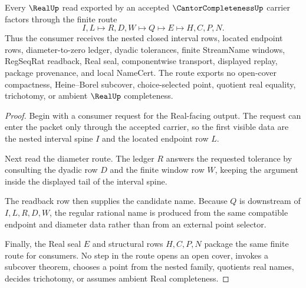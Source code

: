 \begin{theorem}
\label{thm:cantor-completeness-nested-diameter-handoff}
Every $\RealUp$ read exported by an accepted $\CantorCompletenessUp$ carrier factors through the finite route
$$
I,L \longmapsto R,D,W \longmapsto Q \longmapsto E \longmapsto H,C,P,N .
$$
Thus the consumer receives the nested closed interval rows, located endpoint rows, diameter-to-zero ledger, dyadic tolerances, finite StreamName windows, RegSeqRat readback, Real seal, componentwise transport, displayed replay, package provenance, and local NameCert. The route exports no open-cover compactness, Heine--Borel subcover, choice-selected point, quotient real equality, trichotomy, or ambient $\RealUp$ completeness.
\end{theorem}
\begin{proof}
Begin with a consumer request for the Real-facing output. The request can enter the packet only through the accepted carrier, so the first visible data are the nested interval spine $I$ and the located endpoint row $L$.

Next read the diameter route. The ledger $R$ answers the requested tolerance by consulting the dyadic row $D$ and the finite window row $W$, keeping the argument inside the displayed tail of the interval spine.

The readback row then supplies the candidate name. Because $Q$ is downstream of $I,L,R,D,W$, the regular rational name is produced from the same compatible endpoint and diameter data rather than from an external point selector.

Finally, the Real seal $E$ and structural rows $H,C,P,N$ package the same finite route for consumers. No step in the route opens an open cover, invokes a subcover theorem, chooses a point from the nested family, quotients real names, decides trichotomy, or assumes ambient Real completeness.
\end{proof}


